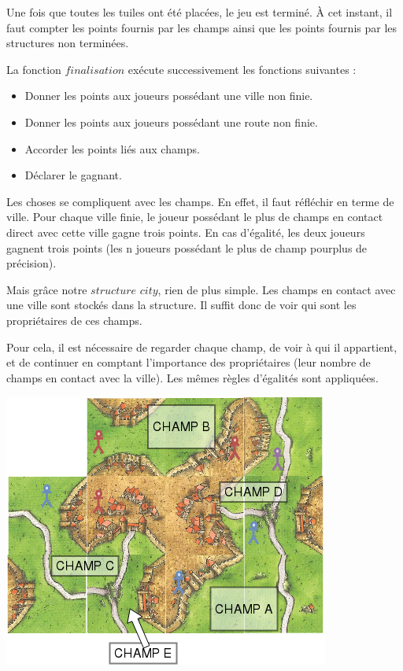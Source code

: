 Une fois que toutes les tuiles ont été placées, le jeu est terminé. À cet instant, il faut compter les points fournis par les champs ainsi que les points fournis par les structures non terminées.

La fonction $finalisation$ exécute successivement les fonctions suivantes :
\begin{itemize}
    \item Donner les points aux joueurs possédant une ville non finie.
    \item Donner les points aux joueurs possédant une route non finie.
    \item Accorder les points liés aux champs.
    \item Déclarer le gagnant.
\end{itemize}

Les choses se compliquent avec les champs. En effet, il faut réfléchir en terme de ville. Pour chaque ville finie, le joueur possédant le plus de champs en contact direct avec cette ville gagne trois points. En cas d'égalité, les deux joueurs gagnent trois points (les n joueurs possédant le plus de champ pourplus de précision).\newline

Mais grâce notre $structure$ $city$, rien de plus simple. Les champs en contact avec une ville sont stockés dans la structure. Il suffit donc de voir qui sont les propriétaires de ces champs. \newline

Pour cela, il est nécessaire de regarder chaque champ, de voir à qui il appartient, et de continuer en comptant l'importance des propriétaires (leur nombre de champs en contact avec la ville). Les mêmes règles d'égalités sont appliquées. \newline 


\includegraphics[scale=1]{Comptagepoint.png}


